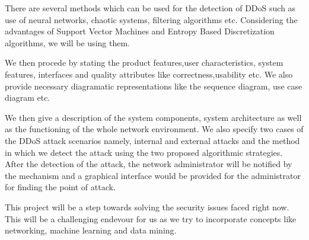 \documentclass[12pt,a4paper,final]{report}
\begin{document}
There are several methods which can be used for the detection of DDoS such as use of neural networks, chaotic 
systems, filtering algorithms etc. Considering the advantages of Support Vector Machines and Entropy Based Discretization algorithms, we will be using them.

We then procede by stating the product features,user characteristics, system features, interfaces and quality 
attributes like correctness,usability etc. We also provide necessary diagramatic representations like the 
sequence diagram, use case diagram etc.

We then give a description of the system components, system architecture as well as the functioning of the whole
network environment. We also specify two cases of the DDoS attack scenarios namely, internal and external attacks and the method in which we detect the attack using the two proposed algorithmic strategies. After the detection of the attack, the network administrator will be notified by the mechanism and a graphical interface would be provided for the administrator for finding the point of attack.

This project will be a step towards solving the security issues faced right now. This will be a challenging endevour for us as we try to incorporate concepts like networking, machine learning and data mining.  
\newpage
\end{document}
